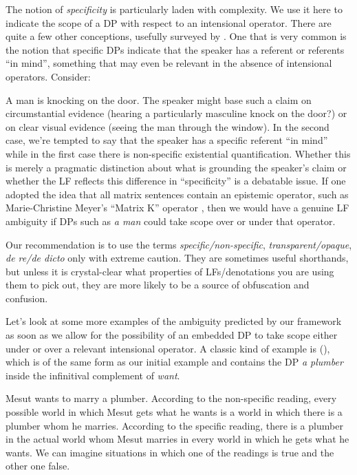 The notion of \emph{specificity} is particularly laden with complexity. We use
it here to indicate the scope of a DP with respect to an intensional operator.
There are quite a few other conceptions, usefully surveyed by
\cite{heusinger-2011-specificity}. One that is very common is the notion that
specific DPs indicate that the speaker has a referent or referents ``in mind'',
something that may even be relevant in the absence of intensional operators.
Consider:

\ex
A man is knocking on the door.
\xe
%
The speaker might base such a claim on circumstantial evidence (hearing a
particularly masculine knock on the door?) or on clear visual evidence (seeing
the man through the window). In the second case, we're tempted to say that the
speaker has a specific referent ``in mind'' while in the first case there is
non-specific existential quantification. Whether this is merely a
pragmatic distinction about what is grounding the speaker's claim or whether the
LF reflects this difference in ``specificity'' is a debatable issue. If one
adopted the idea that all matrix sentences contain an epistemic operator, such
as Marie-Christine Meyer's ``Matrix K'' operator \parencite{meyer-2013-thesis},
then we would have a genuine LF ambiguity if DPs such as \emph{a man} could take
scope over or under that operator.

Our recommendation is to use the terms \emph{specific/non-specific},
\emph{transparent/opaque}, \emph{de re/de dicto} only with extreme caution. They
are sometimes useful shorthands, but unless it is crystal-clear what properties
of LFs/denotations you are using them to pick out, they are more likely to be a
source of obfuscation and confusion.

Let's look at some more examples of the ambiguity predicted by our framework as
soon as we allow for the possibility of an embedded DP to take scope either
under or over a relevant intensional operator. A classic kind of example is
(\nextx), which is of the same form as our initial example and contains the DP
\emph{a plumber} inside the infinitival complement of \emph{want}.

\ex Mesut wants to marry a plumber. \xe
%
According to the non-specific reading, every possible world in which Mesut gets
what he wants is a world in which there is a plumber whom he marries. According
to the specific reading, there is a plumber in the actual world whom Mesut
marries in every world in which he gets what he wants. We can imagine situations
in which one of the readings is true and the other one false.

